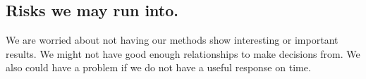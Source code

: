 \documentclass[11pt]{report}
\begin{document}
\subsection*{\hspace{-.5cm} Risks we may run into.}\label{tech}
We are worried about not having our methods show interesting or important results.  We might not have good enough relationships to make decisions from.  We also could have a problem if we do not have a useful response on time.  
\end{document}
